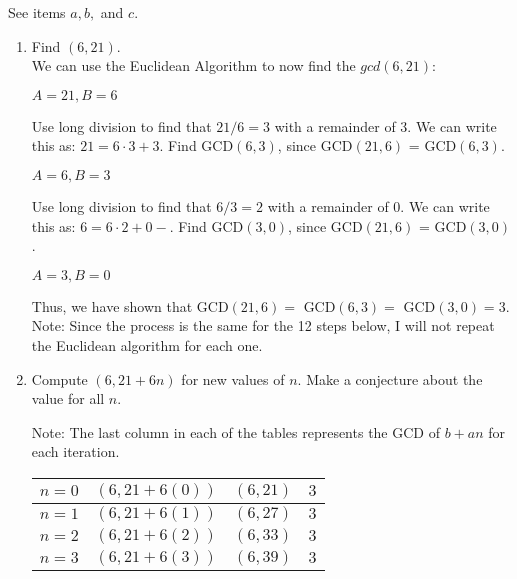 \documentclass[12pt]{article}
\newenvironment{problem}[2][Problem]{\begin{trivlist}
\item[\hskip \labelsep {\bfseries #1}\hskip \labelsep {\bfseries #2.}]}{\end{trivlist}}
\begin{document}
\begin{problem}{4} See items $a, b,$ and $c$.
\begin{enumerate}[label=(\alph*)] 
\item Find $(6,21)$. \\

\noindent
We can use the Euclidean Algorithm to now find the $gcd(6,21)$:

\begin{center}
$A=21, B=6$
\end{center}

\noindent
Use long division to find that $21/6 = 3$ with a remainder of $3$. We can write this as: $21 = 6 \cdot 3 +3$.
Find GCD$(6,3)$, since GCD$(21,6)$ = GCD$(6,3)$.

\begin{center}
$A=6, B=3$
\end{center}

\noindent
Use long division to find that $6/3 = 2$ with a remainder of $0$. We can write this as: $6 = 6 \cdot 2 +0-$.
Find GCD$(3,0)$, since GCD$(21,6)$ = GCD$(3,0)$.

\begin{center}
$A=3, B=0$
\end{center}

\noindent
Thus, we have shown that GCD$(21,6)=$ GCD$(6,3)=$ GCD$(3,0)=3$. Note: Since the process is the same for the 12 steps below, I will not repeat the Euclidean algorithm for each one. \\

\item Compute $(6, 21+6n)$ for new values of $n$. Make a conjecture about the value for all $n$. 

\noindent
Note: The last column in each of the tables represents the GCD of $b+an$ for each iteration. \\

\begin{center}
\begin{tabu} to 0.7\textwidth { | X[c] | X[c] | X[c] | X[c] |}
 \hline
 $n=0$ & $(6, 21+6(0))$ & $(6, 21)$ & $3$\\
 \hline
 $n=1$ & $(6, 21+6(1))$ & $(6, 27)$ & $3$\\
\hline
 $n=2$ & $(6, 21+6(2))$ & $(6, 33)$ & $3$\\
\hline
 $n=3$ & $(6, 21+6(3))$ & $(6, 39)$ & $3$\\
\hline
\end{tabu}
\end{center}


\end{enumerate}
\end{problem}
\end{document}
